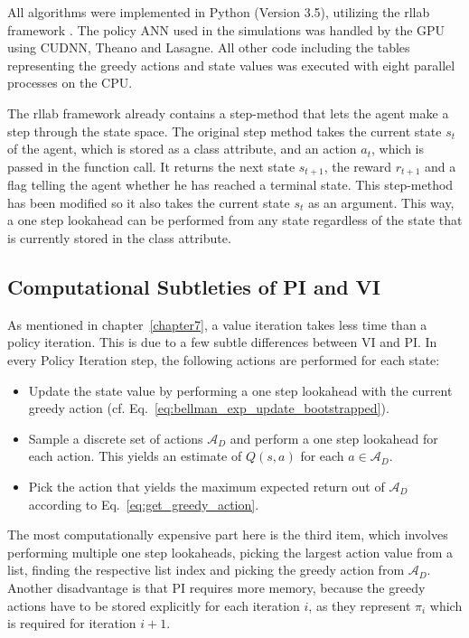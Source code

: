 All algorithms were implemented in Python (Version 3.5), utilizing the rllab framework \cite{rllab2018}. The policy ANN used in the simulations was handled by the GPU using CUDNN, Theano and Lasagne. All other code including the tables representing the greedy actions and state values was executed with eight parallel processes on the CPU. \smallbreak

The rllab framework already contains a step-method that lets the agent make a step through the state space. The original step method takes the current state $s_t$ of the agent, which is stored as a class attribute, and an action $a_t$, which is passed in the function call. It returns the next state $s_{t+1}$, the reward $r_{t+1}$ and a flag telling the agent whether he has reached a terminal state. This step-method has been modified so it also takes the current state $s_t$ as an argument. This way, a one step lookahead can be performed from any state regardless of the state that is currently stored in the class attribute.

\newpage
\subsection{Computational Subtleties of PI and VI}

As mentioned in chapter~\ref{chapter7}, a value iteration takes less time than a policy iteration. This is due to a few subtle differences between VI and PI. In every Policy Iteration step, the following actions are performed for each state:

\begin{itemize}
	\item Update the state value by performing a one step lookahead with the current greedy action (cf. Eq.~\ref{eq:bellman_exp_update_bootstrapped}).
	\item Sample a discrete set of actions $\mathcal{A}_D$ and perform a one step lookahead for each action. This yields an estimate of $Q(s,a)$ for each $a\in \mathcal{A}_D$.
	\item Pick the action that yields the maximum expected return out of $\mathcal{A}_D$ according to Eq.~\ref{eq:get_greedy_action}.
\end{itemize}

The most computationally expensive part here is the third item, which involves performing multiple one step lookaheads, picking the largest action value from a list, finding the respective list index and picking the greedy action from $\mathcal{A}_D$. Another disadvantage is that PI requires more memory, because the greedy actions have to be stored explicitly for each iteration $i$, as they represent $\pi_i$ which is required for iteration $i+1$.\bigbreak

